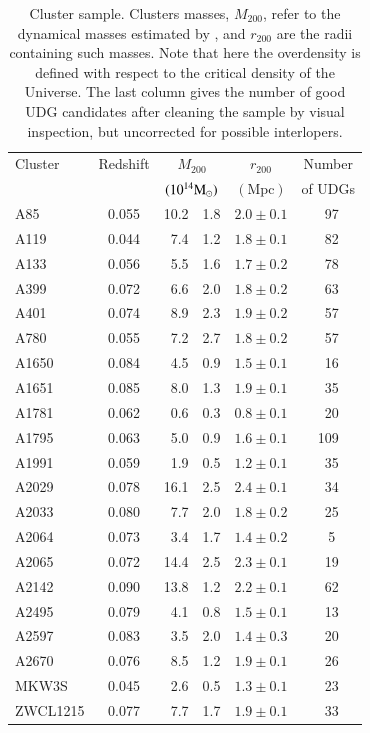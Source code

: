 \documentclass[usenatbib,fleqn]{mnras}
\begin{document}
\begin{table}
 \centering
\caption{Cluster sample. Clusters masses, $M_{200}$, refer to the dynamical masses estimated by \citet{sifon15_cccp}, and $r_{200}$ are the radii containing such masses. Note that here the overdensity is defined with respect to the critical density of the Universe. The last column gives the number of good UDG candidates after cleaning the sample by visual inspection, but uncorrected for possible interlopers.}
\label{t:clusters}
\begin{tabular}{l c r@{ $\pm$ }l c c}
\hline\hline
 Cluster & Redshift & \multicolumn{2}{c}{$M_{200}$} & $r_{200}$ & Number \\
         &          & \multicolumn{2}{c}{$(10^{14}\mathrm{M}_\odot)$} & $(\mathrm{Mpc})$ & of UDGs \\[0.5ex]
\hline
%
A85        & 0.055 & 10.2 & 1.8 & $2.0\pm0.1$ & \,\,\,97 \\
A119       & 0.044 &  7.4 & 1.2 & $1.8\pm0.1$ & \,\,\,82 \\
A133       & 0.056 &  5.5 & 1.6 & $1.7\pm0.2$ & \,\,\,78 \\
A399       & 0.072 &  6.6 & 2.0 & $1.8\pm0.2$ & \,\,\,63 \\
A401       & 0.074 &  8.9 & 2.3 & $1.9\pm0.2$ & \,\,\,57 \\
A780       & 0.055 &  7.2 & 2.7 & $1.8\pm0.2$ & \,\,\,57 \\
A1650      & 0.084 &  4.5 & 0.9 & $1.5\pm0.1$ & \,\,\,16 \\
A1651      & 0.085 &  8.0 & 1.3 & $1.9\pm0.1$ & \,\,\,35 \\
A1781      & 0.062 &  0.6 & 0.3 & $0.8\pm0.1$ & \,\,\,20 \\
A1795      & 0.063 &  5.0 & 0.9 & $1.6\pm0.1$ &      109 \\
A1991      & 0.059 &  1.9 & 0.5 & $1.2\pm0.1$ & \,\,\,35 \\
A2029      & 0.078 & 16.1 & 2.5 & $2.4\pm0.1$ & \,\,\,34 \\
A2033      & 0.080 &  7.7 & 2.0 & $1.8\pm0.2$ & \,\,\,25 \\
A2064      & 0.073 &  3.4 & 1.7 & $1.4\pm0.2$ & \,\,\,5 \\
A2065      & 0.072 & 14.4 & 2.5 & $2.3\pm0.1$ & \,\,\,19 \\
A2142      & 0.090 & 13.8 & 1.2 & $2.2\pm0.1$ & \,\,\,62 \\
A2495      & 0.079 &  4.1 & 0.8 & $1.5\pm0.1$ & \,\,\,13 \\
A2597      & 0.083 &  3.5 & 2.0 & $1.4\pm0.3$ & \,\,\,20 \\
A2670      & 0.076 &  8.5 & 1.2 & $1.9\pm0.1$ & \,\,\,26 \\
MKW3S      & 0.045 &  2.6 & 0.5 & $1.3\pm0.1$ & \,\,\,23 \\
ZWCL1215   & 0.077 &  7.7 & 1.7 & $1.9\pm0.1$ & \,\,\,33 \\
[0.5ex]
\hline
\end{tabular}
\end{table}
\end{document}
